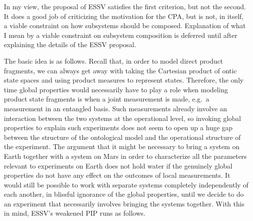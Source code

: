 \documentclass[DIV=calc,paper=a4,fontsize=11pt,twocolumn]{scrartcl} %
\theoremstyle{definition}
\theoremstyle{plain}
\begin{document}
In my view, the proposal of ESSV satisfies the first criterion, but
not the second.  It does a good job of criticizing the motivation for
the CPA, but is not, in itself, a viable constraint on how subsystems
should be composed.  Explanation of what I mean by a viable constraint
on subsystem composition is deferred until after explaining the details
of the ESSV proposal.

The basic idea is as follows.  Recall that, in order to model direct
product fragments, we can always get away with taking the Cartesian
product of ontic state spaces and using product measures to represent
states.  Therefore, the only time global properties would necessarily
have to play a role when modeling product state fragments is when a
joint measurement is made, e.g.\ a measurement in an entangled basis.
Such measurements already involve an interaction between the two
systems at the operational level, so invoking global properties to
explain such experiments does not seem to open up a huge gap between
the structure of the ontological model and the operational structure
of the experiment.  The argument that it might be necessary to bring a
system on Earth together with a system on Mars in order to
characterize all the parameters relevant to experiments on Earth does
not hold water if the genuinely global properties do not have any
effect on the outcomes of local measurements.  It would still be
possible to work with separate systems completely independently of
each another, in blissful ignorance of the global properties, until we
decide to do an experiment that necessarily involves bringing the
systems together.  With this in mind, ESSV's weakened PIP runs as
follows.
\end{document}
